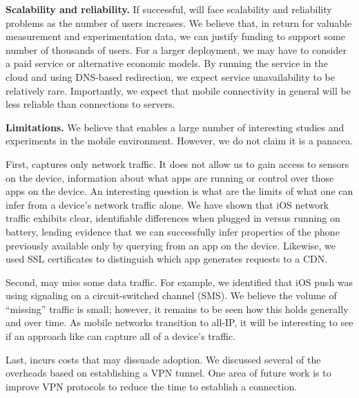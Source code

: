 \noindent\textbf{Scalability and reliability.} If successful, \meddle will 
face scalability and reliability problems as the number of users increases. 
We believe that, in return for valuable measurement and experimentation data, 
we can justify funding to support some number of thousands of users. For a 
larger deployment, we may have to consider a paid service or alternative 
economic models. By running the service in the cloud and using DNS-based 
redirection, we expect service unavailability to be relatively rare. Importantly, 
we expect that mobile connectivity in general will be less reliable than connections 
to \meddle servers.

\noindent\textbf{Limitations.} We believe that \meddle enables a large number 
of interesting studies and experiments in the mobile environment. However, we 
do not claim it is a panacea. 

First, \meddle captures only network traffic. It does 
not allow us to gain access to sensors on the device, information about what 
apps are running or control over those apps on the device. An interesting question 
is what are the limits of what one can infer from a device's network traffic alone. 
We have shown that iOS network traffic exhibits clear, identifiable differences 
when plugged in versus running on battery, lending evidence that we can successfully 
infer properties of the phone previously available only by querying from an app 
on the device. Likewise, we used SSL certificates to distinguish which app generates 
requests to a CDN.

Second, \meddle may miss some data traffic. For example, we identified that 
iOS push was using signaling on a circuit-switched channel (SMS). We believe 
the volume of ``missing'' traffic is small; however, it remains to be seen how 
this holds generally and over time. As mobile networks transition to all-IP, it will 
be interesting to see if an approach like \meddle can capture all of a device's traffic.

Last, \meddle incurs costs that may dissuade adoption. We discussed several of the 
overheads based on establishing a VPN tunnel. One area of future work is to improve 
VPN protocols to reduce the time to establish a connection. 
